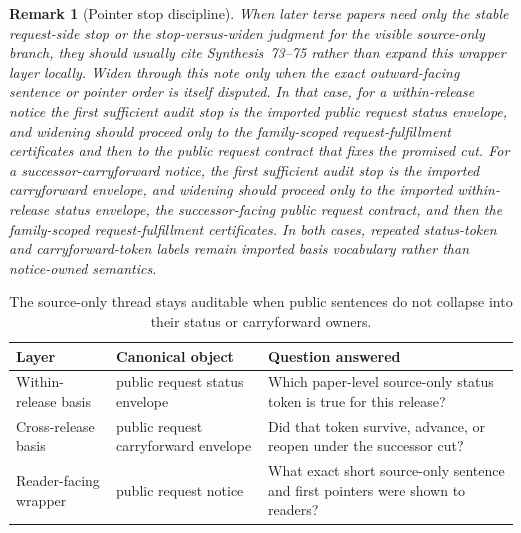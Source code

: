 \documentclass[11pt]{article}
\newtheorem{remark}{Remark}
\begin{document}
\begin{remark}[Pointer stop discipline]
When later terse papers need only the stable request-side stop or the stop-versus-widen judgment for the visible source-only branch, they should usually cite Synthesis~73--75 rather than expand this wrapper layer locally.
Widen through this note only when the exact outward-facing sentence or pointer order is itself disputed. In that case, for a within-release notice the first sufficient audit stop is the imported public request status envelope, and widening should proceed only to the family-scoped request-fulfillment certificates and then to the public request contract that fixes the promised cut.
For a successor-carryforward notice, the first sufficient audit stop is the imported carryforward envelope, and widening should proceed only to the imported within-release status envelope, the successor-facing public request contract, and then the family-scoped request-fulfillment certificates.
In both cases, repeated status-token and carryforward-token labels remain imported basis vocabulary rather than notice-owned semantics.
\end{remark}

\begin{table}[t]
\centering
\small
\begin{tabularx}{\linewidth}{@{}l l X@{}}
\toprule
Layer & Canonical object & Question answered \\
\midrule
Within-release basis & public request status envelope & Which paper-level source-only status token is true for this release? \\
Cross-release basis & public request carryforward envelope & Did that token survive, advance, or reopen under the successor cut? \\
Reader-facing wrapper & public request notice & What exact short source-only sentence and first pointers were shown to readers? \\
\bottomrule
\end{tabularx}
\caption{The source-only thread stays auditable when public sentences do not collapse into their status or carryforward owners.}
\label{tab:publicrequestnotices}
\end{table}
\end{document}
